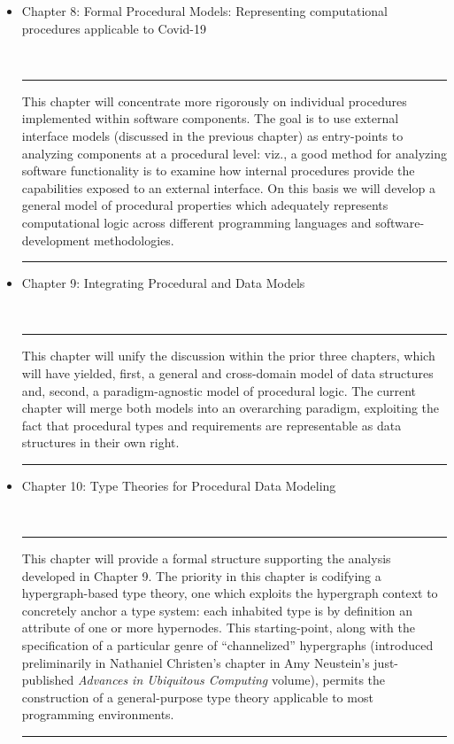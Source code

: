 \documentclass{statsoc}
\newcommand{\textscc}[1]{{\color{orr!35!black}{{%
						\fontfamily{Cabin-TLF}\fontseries{b}\selectfont{\textsc{\scriptsize{#1}}}}}}}
\newcommand{\AcronymText}[1]{{\textscc{#1}}}
\newcommand{\q}[1]{{\fontfamily{qcr}\selectfont ``}#1{\fontfamily{qcr}\selectfont ''}}
\newcommand{\API}{\resizebox{!}{7pt}{\AcronymText{API}}}
\newenvironment{summary}{\\\vspace{-4pt}%
%
%
\noindent\hfil\textcolor{rgrey!50!purple}{\rule{0.5\textwidth}{.4pt}}\hfil

\hspace{-2cm}\begin{minipage}{1.02\textwidth}\fontfamily{phv}\fontsize{9}{11}\selectfont}%
{\\\vspace{-1em}\end{minipage}
{\begin{center}\textcolor{rgrey!50!yellow}{\rule{0.5\textwidth}{.4pt}}\end{center}}
\vspace{2em}}%
\begin{document}
{\begin{description}
\begin{itemize}
\begin{summary}
This chapter will focus on \API{}s, command-line interfaces, 
and related technologies through which software components 
communicate with one another.  The purpose of this review is 
to direct attention not at specific procedures which are 
implemented within a given software component, but rather 
to show how components expose functionality to the 
\q{outside world.}  This review sets the 
stage for a more internal focus (implementation 
details within a software component) in the following chapter. 
\end{summary}

\item Chapter 8: Formal Procedural Models: Representing 
computational procedures applicable to Covid-19

\begin{summary}
This chapter will concentrate more rigorously on individual 
procedures implemented within software components.  
The goal is to use external interface models (discussed 
in the previous chapter) as entry-points to analyzing 
components at a procedural level: viz., a good method for 
analyzing software functionality is to examine how 
internal procedures provide the capabilities exposed 
to an external interface.  On this basis we will 
develop a general model of procedural properties 
which adequately represents computational logic 
across different programming languages and 
software-development methodologies.   
\end{summary}

\item Chapter 9: Integrating Procedural and Data Models

\begin{summary}
This chapter will unify the discussion within the prior 
three chapters, which will have yielded, first, a 
general and cross-domain model of data structures and, 
second, a paradigm-agnostic model of procedural logic.  
The current chapter will merge both models into an 
overarching paradigm, exploiting the fact that 
procedural types and requirements are representable 
as data structures in their own right. 
\end{summary}

\item Chapter 10: Type Theories for Procedural Data Modeling

\begin{summary}
This chapter will provide a formal structure supporting 
the analysis developed in Chapter 9.  The priority 
in this chapter is codifying a hypergraph-based 
type theory, one which exploits the hypergraph context 
to concretely anchor a type system: each inhabited 
type is by definition an attribute of one or more 
hypernodes.  This starting-point, along with the 
specification of a particular genre of 
\q{channelized} hypergraphs (introduced preliminarily in 
Nathaniel Christen's chapter in Amy Neustein's 
just-published \textit{Advances in Ubiquitous Computing} 
volume), permits the construction of a general-purpose 
type theory applicable to most programming environments.  
\end{summary}


\end{itemize}
\end{description}}
\end{document}
